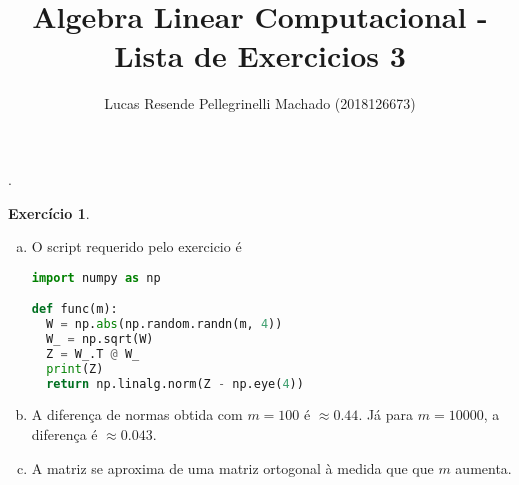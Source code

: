 \documentclass[11pt]{article}
\begin{document}
  {}%
  {}%
  {}%
  {}%
  {\bfseries}%
  {.}%
  {\newline}%
  {}%

\theoremstyle{definition}
\theoremstyle{break}
\newtheorem{exerc}{Exercício}

\author{Lucas Resende Pellegrinelli Machado (2018126673)}
\title{Algebra Linear Computacional - Lista de Exercicios 3}
\maketitle

\medskip

\begin{exerc}
\begin{enumerate}[a.]
.
\item
O script requerido pelo exercicio é
\begin{lstlisting}[language=Python]
import numpy as np

def func(m):
  W = np.abs(np.random.randn(m, 4))
  W_ = np.sqrt(W)
  Z = W_.T @ W_
  print(Z)
  return np.linalg.norm(Z - np.eye(4))
\end{lstlisting}

\item
A diferença de normas obtida com $m = 100$ é $\approx 0.44$. Já para $m = 10000$, a diferença é $\approx 0.043$.

\item
A matriz se aproxima de uma matriz ortogonal à medida que que $m$ aumenta.

\end{enumerate}
\end{exerc}
\end{document}
